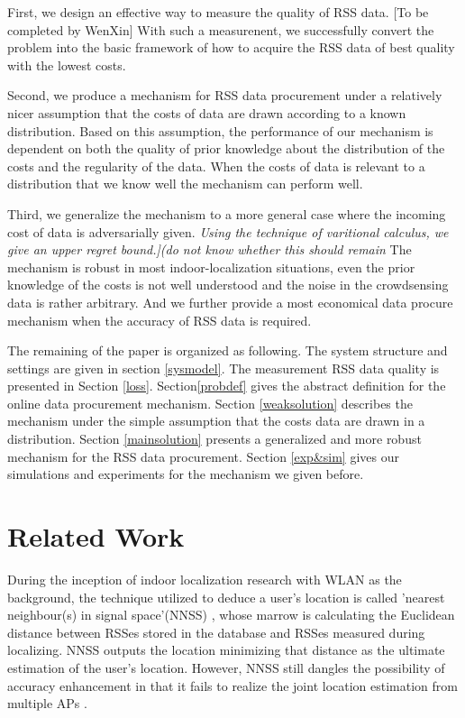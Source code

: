 \documentclass[10pt,conference,compsocconf,letterpaper]{IEEEtran}
\begin{document}
First, we design an effective way to measure the quality of RSS data. [To be completed by WenXin] With such a measurenent, we successfully convert the problem into the basic framework of how to acquire the RSS data of best quality with the lowest costs.

Second, we produce a mechanism for RSS data procurement under a relatively nicer assumption that the costs of data are drawn according to a known distribution. Based on this assumption, the performance of our mechanism is dependent on both the quality of prior knowledge about the distribution of the costs and the regularity of the data. When the costs of data is relevant to a distribution that we know well the mechanism can perform well. 

Third, we generalize the mechanism to a more general case where the incoming cost of data is adversarially given. \emph{Using the technique of varitional calculus, we give an upper regret bound.](do not know whether this should remain} The mechanism is robust in most indoor-localization situations, even the prior knowledge of the costs is not well understood and the noise in the crowdsensing data is rather arbitrary. And we further provide a most economical data procure mechanism when the accuracy of RSS data is required.

The remaining of the paper is organized as following. The system structure and settings are given in section \ref{sysmodel}. The measurement  RSS data quality is presented in Section \ref{loss}. Section\ref{probdef}  gives the abstract definition for the online data procurement mechanism. Section \ref{weaksolution} describes the mechanism under the simple assumption that the costs data are drawn in a distribution. Section \ref{mainsolution} presents a generalized and more robust mechanism for the RSS data procurement. Section \ref{exp&sim} gives our simulations and experiments for the mechanism we given before.



\section{Related Work \label{sectionrelatedwork}}
During the inception of indoor localization research with WLAN as the background, the technique utilized to deduce a user's location is called 'nearest neighbour(s) in signal space'(NNSS) \cite{radar}, whose marrow is calculating the Euclidean distance between RSSes stored in the database and RSSes measured during localizing. NNSS outputs the location minimizing that distance as the ultimate estimation of the user’s location. However, NNSS still dangles the possibility of accuracy enhancement in that it fails to realize the joint location estimation from multiple APs \cite{castro01}.
\end{document}
